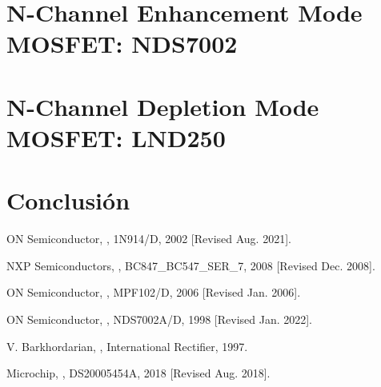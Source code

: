 \documentclass[conference]{IEEEtran}
\begin{document}
\section{N-Channel Enhancement
Mode MOSFET: NDS7002}


\section{N-Channel Depletion Mode MOSFET: LND250}


\section{Conclusión}


\begin{thebibliography}{1}

ON Semiconductor, , 1N914/D, 2002 [Revised Aug. 2021].

NXP Semiconductors, , BC847\_BC547\_SER\_7, 2008 [Revised Dec. 2008].

ON Semiconductor, , MPF102/D, 2006 [Revised Jan. 2006].

ON Semiconductor, , NDS7002A/D, 1998 [Revised Jan. 2022].

V. Barkhordarian, , International Rectifier, 1997.

Microchip, , DS20005454A, 2018 [Revised Aug. 2018].

\end{thebibliography}
\end{document}
